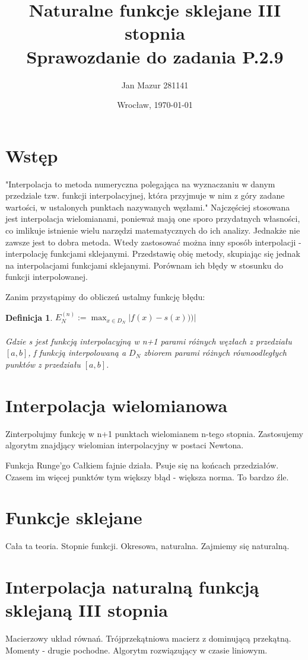 \documentclass{article}
\author{Jan Mazur 281141}
\date{Wrocław, \today}
\title{\textbf{Naturalne funkcje sklejane III stopnia} \\ Sprawozdanie do zadania P.2.9	}
\newtheorem{defi}{Definicja}
\begin{document}
\maketitle

\section{Wstęp}
"Interpolacja to metoda numeryczna polegająca na wyznaczaniu w danym przedziale tzw. funkcji interpolacyjnej, która przyjmuje w nim z góry zadane wartości, w ustalonych punktach nazywanych węzłami." \cite{wikipedia_pl}
Najczęściej stosowana jest interpolacja wielomianami, ponieważ  mają one sporo przydatnych własności, co imlikuje istnienie wielu narzędzi matematycznych do ich analizy. Jednakże nie zawsze jest to dobra metoda.
Wtedy zastosować można inny sposób interpolacji - interpolację funkcjami sklejanymi.
Przedstawię obię metody, skupiając się jednak na interpolacjami funkcjami sklejanymi. Porównam ich błędy w stosunku do funkcji interpolowanej.

Zanim przystąpimy do obliczeń ustalmy funkcję błędu:

\begin{defi}
	$E_N^{(n)} := \max_{x \in D_N}|f(x)-s(x)))|$ \\
	\\
	Gdzie s jest funkcją interpolacyjną w n+1 parami różnych węzłach z przedziału $[a,b]$, f funkcją interpolowaną a $D_N$ zbiorem parami różnych równoodległych punktów z przedziału $[a,b]$.
\end{defi}

\section{Interpolacja wielomianowa}
Zinterpolujmy funkcję w n+1 punktach wielomianem n-tego stopnia.
Zastosujemy algorytm znajdjący wielomian interpolacyjny w postaci Newtona.

Funkcja Runge'go
Całkiem fajnie działa. Psuje się na końcach przedziałów. Czasem im więcej punktów tym większy błąd - większa norma. To bardzo źle.

\section{Funkcje sklejane}

Cała ta teoria. Stopnie funkcji. Okresowa, naturalna.
Zajmiemy się naturalną.

\section{Interpolacja naturalną funkcją sklejaną III stopnia}
Macierzowy układ równań. Trójprzekątniowa macierz z dominującą przekątną.
Momenty - drugie pochodne.
Algorytm rozwiązujący w czasie liniowym.
\end{document}

